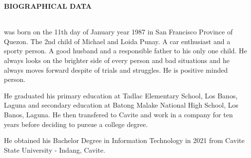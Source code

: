 \begin{doublespace}
	\thispagestyle{empty}

	\begin{center}
		\textbf{BIOGRAPHICAL DATA}
	\end{center}
	\leavevmode\\


	\justify
	\textbf{} was born on the 11th day of January year
	1987 in San Francisco Province of Quezon. The 2nd child of Michael and Loida
	Punay. A car enthusiast and a sporty person. A good husband and
	a responsible father to his only one child. He always looks on the brighter
	side of every person and bad situations and he always moves forward despite
	of trials and struggles. He is positive minded person.

	\parx
	He graduated his primary education at Tadlac Elementary School, Los Banos, Laguna
	and secondary education at Batong Malake National High School, Los Banos, Laguna.
	He then transfered to Cavite and work in a company for ten years before deciding
	to pursue a college degree.

	\parx
	He obtained his Bachelor Degree in Information Technology in 2021 from Cavite
	State University - Indang, Cavite.
\end{doublespace}
